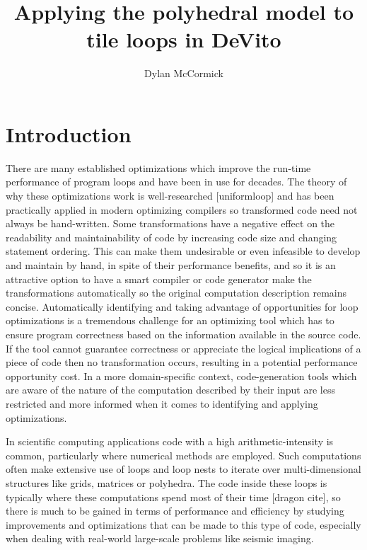 \documentclass[a4paper,12pt,twoside]{report}
\title{Applying the polyhedral model to tile loops in DeVito}
\author{Dylan McCormick}
\begin{document}
\maketitle

\tableofcontents

\begin{abstract}
\end{abstract}

\chapter{Introduction}
There are many established optimizations which improve the run-time performance of program loops and have been in use for decades.
The theory of why these optimizations work is well-researched [uniformloop] and has been practically applied in modern optimizing compilers so
transformed code need not always be hand-written. Some transformations have a negative effect on the readability and maintainability of code by
increasing code size and changing statement ordering. This can make them undesirable or even infeasible to develop and maintain by hand, in spite
of their performance benefits, and so it is an attractive option to have a smart compiler or code generator make the transformations automatically so the
original computation description remains concise. Automatically identifying and taking advantage of opportunities for loop optimizations is a tremendous
challenge for an optimizing tool which has to ensure program correctness based on the information available in the source code. If the tool cannot guarantee
correctness or appreciate the logical implications of a piece of code then no transformation occurs, resulting in a potential performance opportunity cost.
In a more domain-specific context, code-generation tools which are aware of the nature of the computation described by their input are less
restricted and more informed when it comes to identifying and applying optimizations.

In scientific computing applications code with a high arithmetic-intensity is common, particularly where numerical methods are employed.
Such computations often make extensive use of loops and loop nests to iterate over multi-dimensional structures like grids, matrices or
polyhedra. The code inside these loops is typically where these computations spend most of their time [dragon cite], so there is much to be gained
in terms of performance and efficiency by studying improvements and optimizations that can be made to this type of code, especially when dealing
with real-world large-scale problems like seismic imaging.
\end{document}

